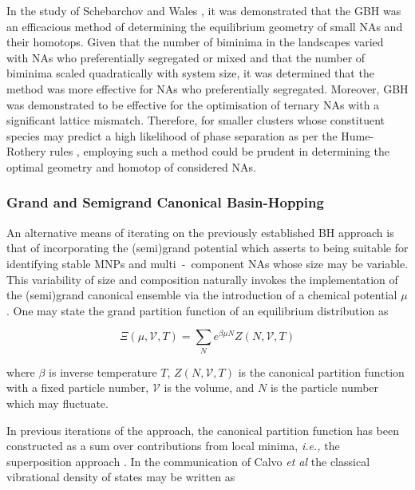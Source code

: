 In the study of Schebarchov and Wales \cite{C5CP01198A}, it was demonstrated that the GBH was an efficacious method of determining the equilibrium geometry of small NAs and their homotops. Given that the number of biminima in the landscapes varied with NAs who preferentially segregated or mixed and that the number of biminima scaled quadratically with system size, it was determined that the method was more effective for NAs who preferentially segregated. Moreover, GBH was demonstrated to be effective for the optimisation of ternary NAs with a significant lattice mismatch. Therefore, for smaller clusters whose constituent species may predict a high likelihood of phase separation as per the Hume-Rothery rules \cite{Hume_Rothery_Rule1,Hume_Rothery_Rule2,Hume_Rothery_Rule3,Hume_Rothery_Rule4}, employing such a method could be prudent in determining the optimal geometry and homotop of considered NAs.

\subsubsection{Grand and Semigrand Canonical Basin-Hopping}
\label{sec:sg_bh}

An alternative means of iterating on the previously established BH approach \cite{Wales1999-dv} is that of incorporating the (semi)grand potential which asserts to being suitable for identifying stable MNPs and multi~-~component NAs whose size may be variable. This variability of size and composition naturally invokes the implementation of the (semi)grand canonical ensemble via the introduction of a chemical potential $\mu$. One may state the grand partition function of an equilibrium distribution as 

\begin{equation}
    \Xi\left(\mu,\mathcal{V}, T\right) = \sum_{N} e^{\beta \mu N}Z\left( N,\mathcal{V}, T\right)
    \label{eqn:gpf}
\end{equation}

where $\beta$ is inverse temperature $T$, $Z\left( N,\mathcal{V}, T\right)$ is the canonical partition function with a fixed particle number, $\mathcal{V}$ is the volume, and $N$ is the particle number which may fluctuate.

In previous iterations of the approach, the canonical partition function has been constructed as a sum over contributions from local minima, \textit{i.e.,} the superposition approach \cite{STRODEL2008105,doi:10.1080/00268979300100141,doi:10.1126/science.225.4666.983}. In the communication of Calvo \textit{et al} \cite{doi:10.1021/acs.jctc.5b00962} the classical vibrational density of states may be written as 

